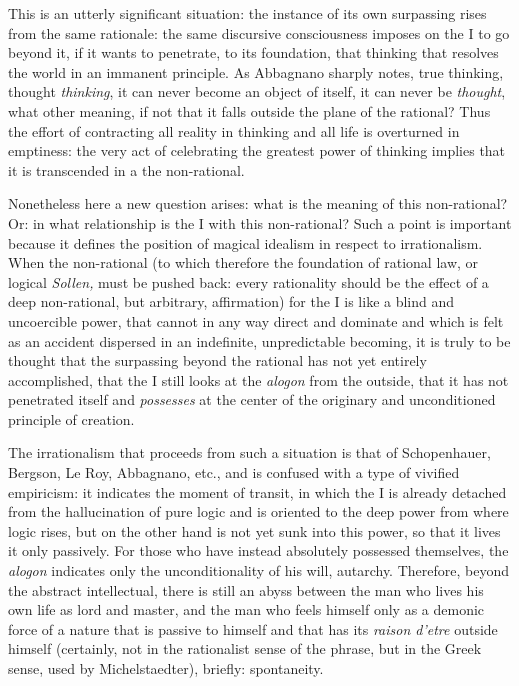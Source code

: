 This is an utterly significant situation: the instance of its own surpassing rises from the same rationale: the same discursive consciousness imposes on the I to go beyond it, if it wants to penetrate, to its foundation, that thinking that resolves the world in an immanent principle. As Abbagnano sharply notes, true thinking, thought \emph{thinking}, it can never become an object of itself, it can never be \emph{thought}, what other meaning, if not that it falls outside the plane of the rational? Thus the effort of contracting all reality in thinking and all life is overturned in emptiness: the very act of celebrating the greatest power of thinking implies that it is transcended in a the non-rational.

Nonetheless here a new question arises: what is the meaning of this non-rational? Or: in what relationship is the I with this non-rational? Such a point is important because it defines the position of magical idealism in respect to irrationalism. When the non-rational (to which therefore the foundation of rational law, or logical \emph{Sollen,} must be pushed back: every rationality should be the effect of a deep non-rational, but arbitrary, affirmation) for the I is like a blind and uncoercible power, that cannot in any way direct and dominate and which is felt as an accident dispersed in an indefinite, unpredictable becoming, it is truly to be thought that the surpassing beyond the rational has not yet entirely accomplished, that the I still looks at the \emph{alogon} from the outside, that it has not penetrated itself and \emph{possesses} at the center of the originary and unconditioned principle of creation.

The irrationalism that proceeds from such a situation is that of Schopenhauer, Bergson, Le Roy, Abbagnano, etc., and is confused with a type of vivified empiricism: it indicates the moment of transit, in which the I is already detached from the hallucination of pure logic and is oriented to the deep power from where logic rises, but on the other hand is not yet sunk into this power, so that it lives it only passively. For those who have instead absolutely possessed themselves, the \emph{alogon} indicates only the unconditionality of his will, autarchy. Therefore, beyond the abstract intellectual, there is still an abyss between the man who lives his own life as lord and master, and the man who feels himself only as a demonic force of a nature that is passive to himself and that has its \emph{raison d'etre} outside himself (certainly, not in the rationalist sense of the phrase, but in the Greek sense, used by Michelstaedter), briefly: spontaneity.


